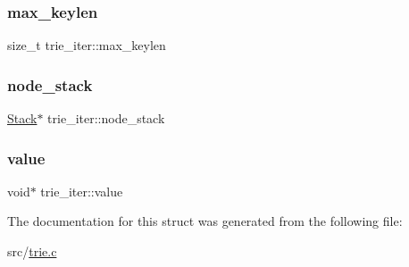 \mbox{\label{structtrie__iter_add40401793ab6e342863b7747af165d1}} 
\subsubsection{\texorpdfstring{max\_keylen}{max\_keylen}}
{\footnotesize\ttfamily size\+\_\+t trie\+\_\+iter\+::max\+\_\+keylen}

\mbox{\label{structtrie__iter_a64c95d56b672bb241db8e24c438e6f07}} 
\subsubsection{\texorpdfstring{node\_stack}{node\_stack}}
{\footnotesize\ttfamily \mbox{\hyperlink{stack_8h_aa7883e8bf747b9dedec990b539df2cc0}{Stack}}$\ast$ trie\+\_\+iter\+::node\+\_\+stack}

\mbox{\label{structtrie__iter_a6b9dbd03ea4c0c5e909ab8608633fe1b}} 
\subsubsection{\texorpdfstring{value}{value}}
{\footnotesize\ttfamily void$\ast$ trie\+\_\+iter\+::value}



The documentation for this struct was generated from the following file\+:\begin{DoxyCompactItemize}
\item 
src/\mbox{\hyperlink{trie_8c}{trie.\+c}}\end{DoxyCompactItemize}
